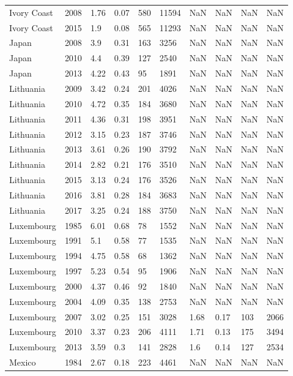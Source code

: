 \begin{tabular}{llllllllll}
Ivory Coast & 2008 & 1.76 & 0.07 & 580 & 11594 & NaN & NaN & NaN & NaN \\ 
Ivory Coast & 2015 & 1.9 & 0.08 & 565 & 11293 & NaN & NaN & NaN & NaN \\ 
Japan & 2008 & 3.9 & 0.31 & 163 & 3256 & NaN & NaN & NaN & NaN \\ 
Japan & 2010 & 4.4 & 0.39 & 127 & 2540 & NaN & NaN & NaN & NaN \\ 
Japan & 2013 & 4.22 & 0.43 & 95 & 1891 & NaN & NaN & NaN & NaN \\ 
Lithuania & 2009 & 3.42 & 0.24 & 201 & 4026 & NaN & NaN & NaN & NaN \\ 
Lithuania & 2010 & 4.72 & 0.35 & 184 & 3680 & NaN & NaN & NaN & NaN \\ 
Lithuania & 2011 & 4.36 & 0.31 & 198 & 3951 & NaN & NaN & NaN & NaN \\ 
Lithuania & 2012 & 3.15 & 0.23 & 187 & 3746 & NaN & NaN & NaN & NaN \\ 
Lithuania & 2013 & 3.61 & 0.26 & 190 & 3792 & NaN & NaN & NaN & NaN \\ 
Lithuania & 2014 & 2.82 & 0.21 & 176 & 3510 & NaN & NaN & NaN & NaN \\ 
Lithuania & 2015 & 3.13 & 0.24 & 176 & 3526 & NaN & NaN & NaN & NaN \\ 
Lithuania & 2016 & 3.81 & 0.28 & 184 & 3683 & NaN & NaN & NaN & NaN \\ 
Lithuania & 2017 & 3.25 & 0.24 & 188 & 3750 & NaN & NaN & NaN & NaN \\ 
Luxembourg & 1985 & 6.01 & 0.68 & 78 & 1552 & NaN & NaN & NaN & NaN \\ 
Luxembourg & 1991 & 5.1 & 0.58 & 77 & 1535 & NaN & NaN & NaN & NaN \\ 
Luxembourg & 1994 & 4.75 & 0.58 & 68 & 1362 & NaN & NaN & NaN & NaN \\ 
Luxembourg & 1997 & 5.23 & 0.54 & 95 & 1906 & NaN & NaN & NaN & NaN \\ 
Luxembourg & 2000 & 4.37 & 0.46 & 92 & 1840 & NaN & NaN & NaN & NaN \\ 
Luxembourg & 2004 & 4.09 & 0.35 & 138 & 2753 & NaN & NaN & NaN & NaN \\ 
Luxembourg & 2007 & 3.02 & 0.25 & 151 & 3028 & 1.68 & 0.17 & 103 & 2066 \\ 
Luxembourg & 2010 & 3.37 & 0.23 & 206 & 4111 & 1.71 & 0.13 & 175 & 3494 \\ 
Luxembourg & 2013 & 3.59 & 0.3 & 141 & 2828 & 1.6 & 0.14 & 127 & 2534 \\ 
Mexico & 1984 & 2.67 & 0.18 & 223 & 4461 & NaN & NaN & NaN & NaN \\ 

\end{tabular}
